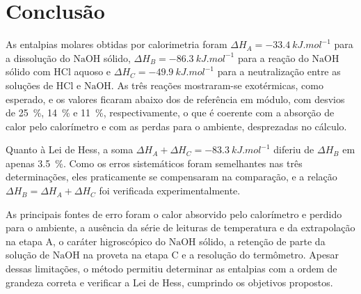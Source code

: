 \section{Conclusão}

As entalpias molares obtidas por calorimetria foram $\Delta H_A = \SI{-33,4}{kJ.mol^{-1}}$ para a dissolução do $\mathrm{NaOH}$ sólido, $\Delta H_B = \SI{-86,3}{kJ.mol^{-1}}$ para a reação do $\mathrm{NaOH}$ sólido com $\mathrm{HCl}$ aquoso e $\Delta H_C = \SI{-49,9}{kJ.mol^{-1}}$ para a neutralização entre as soluções de $\mathrm{HCl}$ e $\mathrm{NaOH}$. As três reações mostraram-se exotérmicas, como esperado, e os valores ficaram abaixo dos de referência em módulo, com desvios de \SI{25}{\%}, \SI{14}{\%} e \SI{11}{\%}, respectivamente, o que é coerente com a absorção de calor pelo calorímetro e com as perdas para o ambiente, desprezadas no cálculo.

Quanto à Lei de Hess, a soma $\Delta H_A + \Delta H_C = \SI{-83,3}{kJ.mol^{-1}}$ diferiu de $\Delta H_B$ em apenas \SI{3,5}{\%}. Como os erros sistemáticos foram semelhantes nas três determinações, eles praticamente se compensaram na comparação, e a relação $\Delta H_B = \Delta H_A + \Delta H_C$ foi verificada experimentalmente.

As principais fontes de erro foram o calor absorvido pelo calorímetro e perdido para o ambiente, a ausência da série de leituras de temperatura e da extrapolação na etapa A, o caráter higroscópico do $\mathrm{NaOH}$ sólido, a retenção de parte da solução de $\mathrm{NaOH}$ na proveta na etapa C e a resolução do termômetro. Apesar dessas limitações, o método permitiu determinar as entalpias com a ordem de grandeza correta e verificar a Lei de Hess, cumprindo os objetivos propostos.
